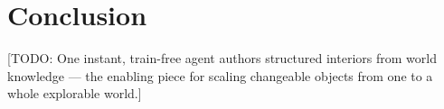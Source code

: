 \documentclass[10pt,twocolumn,letterpaper]{article}
\newcommand{\todo}[1]{{\color{red}\small[TODO: #1]}}
\begin{document}
\section{Conclusion}
\label{sec:conc}
\todo{One instant, train-free agent authors structured interiors from
world knowledge --- the enabling piece for scaling changeable objects
from one to a whole explorable world.}

{\small

}
\end{document}
